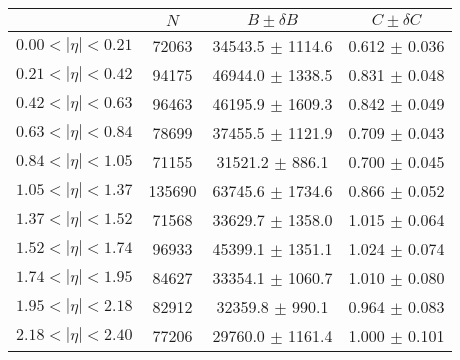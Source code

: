 \begin{tabular}{lccc}
\hline
    &   $N$   & $B \pm \delta B$  &  $C \pm \delta C$ \\
\hline
$0.00 < |\eta| <0.21$          & 72063      & 34543.5    $\pm$ 1114.6 & 0.612      $\pm$ 0.036 \\
$0.21 < |\eta| <0.42$          & 94175      & 46944.0    $\pm$ 1338.5 & 0.831      $\pm$ 0.048 \\
$0.42 < |\eta| <0.63$          & 96463      & 46195.9    $\pm$ 1609.3 & 0.842      $\pm$ 0.049 \\
$0.63 < |\eta| <0.84$          & 78699      & 37455.5    $\pm$ 1121.9 & 0.709      $\pm$ 0.043 \\
$0.84 < |\eta| <1.05$          & 71155      & 31521.2    $\pm$ 886.1 & 0.700      $\pm$ 0.045 \\
$1.05 < |\eta| <1.37$          & 135690     & 63745.6    $\pm$ 1734.6 & 0.866      $\pm$ 0.052 \\
$1.37 < |\eta| <1.52$          & 71568      & 33629.7    $\pm$ 1358.0 & 1.015      $\pm$ 0.064 \\
$1.52 < |\eta| <1.74$          & 96933      & 45399.1    $\pm$ 1351.1 & 1.024      $\pm$ 0.074 \\
$1.74 < |\eta| <1.95$          & 84627      & 33354.1    $\pm$ 1060.7 & 1.010      $\pm$ 0.080 \\
$1.95 < |\eta| <2.18$          & 82912      & 32359.8    $\pm$ 990.1 & 0.964      $\pm$ 0.083 \\
$2.18 < |\eta| <2.40$          & 77206      & 29760.0    $\pm$ 1161.4 & 1.000      $\pm$ 0.101 \\
\hline
\end{tabular}
